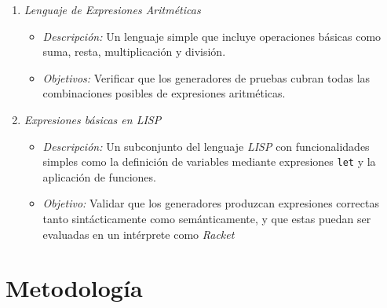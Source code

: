 \documentclass[12pt]{article}
\begin{document}
\begin{enumerate}
\item \textit{Lenguaje de Expresiones Aritméticas}

  \begin{itemize}
  \item \textit{Descripción:} Un lenguaje simple que incluye operaciones básicas como suma, resta, multiplicación y división.
  \item \textit{Objetivos:} Verificar que los generadores de pruebas cubran todas las combinaciones posibles de expresiones aritméticas.
  \end{itemize}
  
\item \textit{Expresiones básicas en LISP}

  \begin{itemize}
  \item \textit{Descripción:} Un subconjunto del lenguaje \textit{LISP} con funcionalidades simples como la definición de variables mediante expresiones \texttt{let} y la aplicación de funciones.
  \item \textit{Objetivo:} Validar que los generadores produzcan expresiones correctas tanto sintácticamente como semánticamente, y que estas puedan ser evaluadas en un intérprete como \textit{Racket}
  \end{itemize}
\end{enumerate}

\section*{Metodología}
\end{document}
